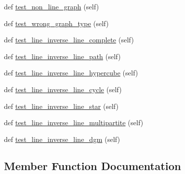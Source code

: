 \begin{DoxyCompactItemize}
\item 
def \hyperlink{classnetworkx_1_1generators_1_1tests_1_1test__line_1_1TestGeneratorInverseLine_acaa3d8b8e314c64ffa9d2a78fad8e6f3}{test\+\_\+non\+\_\+line\+\_\+graph} (self)
\item 
def \hyperlink{classnetworkx_1_1generators_1_1tests_1_1test__line_1_1TestGeneratorInverseLine_a347873f33290fd4d4e85ced070c6fe74}{test\+\_\+wrong\+\_\+graph\+\_\+type} (self)
\item 
def \hyperlink{classnetworkx_1_1generators_1_1tests_1_1test__line_1_1TestGeneratorInverseLine_a8200174e8d4d90b6deddfd963009d43a}{test\+\_\+line\+\_\+inverse\+\_\+line\+\_\+complete} (self)
\item 
def \hyperlink{classnetworkx_1_1generators_1_1tests_1_1test__line_1_1TestGeneratorInverseLine_ad488b7743bc571f9de1dd59e6d98e26f}{test\+\_\+line\+\_\+inverse\+\_\+line\+\_\+path} (self)
\item 
def \hyperlink{classnetworkx_1_1generators_1_1tests_1_1test__line_1_1TestGeneratorInverseLine_a24514630fc6fd5c36c1e5c73b33e38f7}{test\+\_\+line\+\_\+inverse\+\_\+line\+\_\+hypercube} (self)
\item 
def \hyperlink{classnetworkx_1_1generators_1_1tests_1_1test__line_1_1TestGeneratorInverseLine_afffd1733896cb8811a66a6b2ee487deb}{test\+\_\+line\+\_\+inverse\+\_\+line\+\_\+cycle} (self)
\item 
def \hyperlink{classnetworkx_1_1generators_1_1tests_1_1test__line_1_1TestGeneratorInverseLine_a6fe714fd5651b8a3465e50ab7a31d0c3}{test\+\_\+line\+\_\+inverse\+\_\+line\+\_\+star} (self)
\item 
def \hyperlink{classnetworkx_1_1generators_1_1tests_1_1test__line_1_1TestGeneratorInverseLine_a8562462afc95d014d0eac86c7fc9653c}{test\+\_\+line\+\_\+inverse\+\_\+line\+\_\+multipartite} (self)
\item 
def \hyperlink{classnetworkx_1_1generators_1_1tests_1_1test__line_1_1TestGeneratorInverseLine_adb2b3a2305fc8e6c711fd01272b18683}{test\+\_\+line\+\_\+inverse\+\_\+line\+\_\+dgm} (self)
\end{DoxyCompactItemize}


\subsection{Member Function Documentation}
\mbox{\label{classnetworkx_1_1generators_1_1tests_1_1test__line_1_1TestGeneratorInverseLine_a5cb6fc2ffc40fd785b30079e4c5b7757}} 

